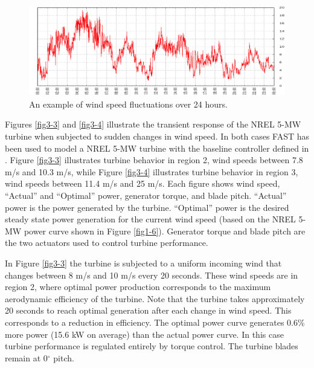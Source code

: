 \begin{figure}[htb]
	\centering
		\includegraphics[width=\linewidth]{Figures/ch3Figures/fig3-2.png}
		
	\caption{An example of wind speed fluctuations over 24 hours.\cite{NWTC2013}}
	\label{fig3-2}
\end{figure}

Figures  \ref{fig3-3} and  \ref{fig3-4} illustrate the transient response of the NREL 5-MW turbine when subjected to sudden changes in wind speed. In both cases FAST has been used to model a NREL 5-MW turbine with the baseline controller defined in \cite{jonkman2009}. Figure \ref{fig3-3} illustrates turbine behavior in region 2, wind speeds between 7.8 m/s and 10.3 m/s, while Figure \ref{fig3-4} illustrates turbine behavior in region 3, wind speeds between 11.4 m/s and 25 m/s.  Each figure shows wind speed, ``Actual'' and ``Optimal'' power, generator torque, and blade pitch. ``Actual'' power is the power generated by the turbine. ``Optimal'' power is the desired steady state power generation for the current wind speed (based on the NREL 5-MW power curve shown in Figure \ref{fig1-6}). Generator torque and blade pitch are the two actuators used to control turbine performance. 

In Figure \ref{fig3-3} the turbine is subjected to a uniform incoming wind that changes between 8 m/s and 10 m/s every 20 seconds. These wind speeds are in region 2, where optimal power production corresponds to the maximum aerodynamic efficiency of the turbine. Note that the turbine takes approximately 20 seconds to reach optimal generation after each change in wind speed. This corresponds to a reduction in efficiency.  The optimal power curve generates 0.6\% more power (15.6 kW on average) than the actual power curve. In this case turbine performance is regulated entirely by torque control. The turbine blades remain at 0$^{\circ}$ pitch. 

